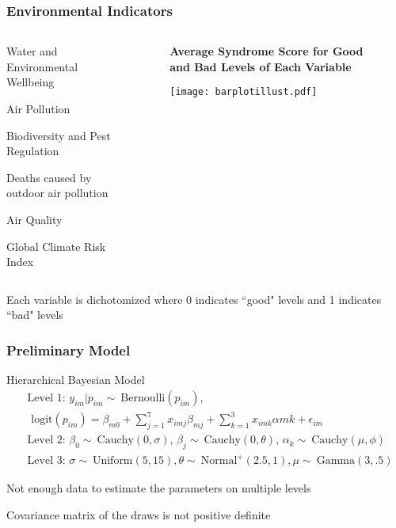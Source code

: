 \documentclass{beamer}
\begin{document}
\begin{frame}
\frametitle{Environmental Indicators}
\footnotesize
\begin{columns}
	\begin{column}{0.40\textwidth}
\itemize
\item Water and Environmental Wellbeing
\item Air Pollution
\item Biodiversity and Pest Regulation
\item Deaths caused by outdoor air pollution
\item Air Quality
\item Global Climate Risk Index
	\end{column}
	\begin{column}{0.55\textwidth}
\centering	
\begin{figure}
  \centering
  \textbf{Average Syndrome Score for Good and Bad Levels of Each Variable}\par\medskip
  \texttt{[image: barplotillust.pdf]}
  \label{SynPerform}
\end{figure}
	\end{column}
\end{columns}
	Each variable is dichotomized where 0 indicates ``good" levels and 1 indicates ``bad" levels
\end{frame}

\begin{frame}
\frametitle{Preliminary Model}
Hierarchical Bayesian Model
\footnotesize
\begin{equation}
\begin{split}
&\text{Level 1: } y_{im}|p_{im} \sim\ \text{Bernoulli}(p_{im}), \\
& \text{  logit}(p_{im}) = \beta_{m0} + \sum_{j=1}^{7} x_{imj} \beta_{mj} + \sum_{k=1}^{3} x_{imk} \alpha{mk} + \epsilon_{im} \\
&\text{Level 2:   } \beta_0 \sim\ \text{Cauchy}(0,\sigma) \text{, } \beta_{j} \sim\ \text{Cauchy}(0,\theta) \text{, } \alpha_k \sim\ \text{Cauchy}(\mu,\phi) \\
&\text{Level 3:  } \sigma \sim\ \text{Uniform}(5,15), \theta \sim\ \text{Normal}^+(2.5,1), \mu \sim\ \text{Gamma}(3,.5)
\end{split}
\end{equation}
\small
\itemize
\item Not enough data to estimate the parameters on multiple levels
\item Covariance matrix of the draws is not positive definite
\end{frame}
\end{document}
